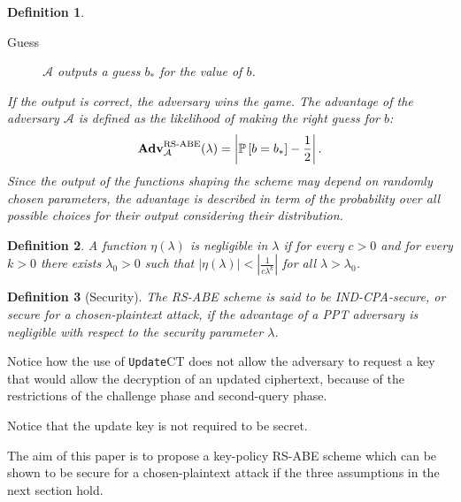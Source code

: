 \documentclass[a4paper,10pt]{article}
\newtheorem{definition}{Definition}
\newcommand{\prob}[1]{\mathbb{P}\left[#1\right]}
\newcommand{\adv}{\textbf{Adv}}
\newcommand{\singlefunction}[1]{\texttt{#1}}
\begin{document}
\begin{definition}
\begin{description}
			
			\item[Guess]
			$\mathcal{A}$ outputs a guess $b_*$ for the value of $b$.
		\end{description}
		If the output is correct, the adversary wins the game.		
		The \emph{advantage} of the adversary $\mathcal{A}$ is defined as the likelihood of making the right guess for $b$:
		\[
			\adv_{\mathcal{A}}^{\textnormal{RS-ABE}}(\lambda)=\left|\prob{b=b_*}-\frac{1}{2}\right|.
		\]
		Since the output of the functions shaping the scheme may depend on randomly chosen parameters, the advantage is described in term of the probability over all possible choices for their output considering their distribution.
	\end{definition}	
	\begin{definition}
 		A function $\eta(\lambda)$ is \emph{negligible} in $\lambda$ if for every $c>0$ and for every $k>0$ there exists $\lambda_0>0$ such that $|\eta(\lambda)| < \left|\frac{1}{c \lambda^{k}}\right|$ for all $\lambda > \lambda_0$.
 	\end{definition}
	\begin{definition}[Security]
		The RS-ABE scheme is said to be \emph{IND-CPA-secure}, or \emph{secure for a chosen-plaintext attack}, if the advantage of a PPT adversary is negligible with respect to the security parameter $\lambda$.
	\end{definition}
	
	
Notice how the use of \singlefunction{Update$\mathrm{CT}$} does not allow the adversary to request a key that would allow the decryption of an updated ciphertext, because of the restrictions of the challenge phase and second-query phase. 
	
	Notice that the update key is not required to be secret.
	
	The aim of this paper is to propose a key-policy RS-ABE scheme which can be shown to be secure for a chosen-plaintext attack if the three assumptions in the next section hold.
	
	
\end{document}
